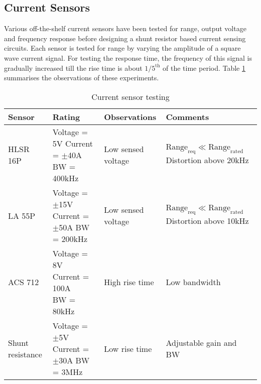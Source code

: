 \subsection{Current Sensors}
    Various off-the-shelf current sensors have been tested for range, output voltage and frequency response before designing a shunt resistor based current sensing  circuits. Each sensor is tested for range by varying the amplitude of a square wave current signal. For testing the response time, the frequency of this signal is gradually increased till the rise time is about $1/5^\text{th}$ of the time period. Table \ref{tab:current-sensor} summarises the observations of these experiments.
	\begin{table}[h]
	\centering
		\begin{tabular}{| l | p{3cm} | p{4cm} | p{4cm} |} \hline
			\textbf{Sensor} & \textbf{Rating} & \textbf{Observations} & \textbf{Comments}\\ \hline
			HLSR 16P & \parbox[t]{3cm}{Voltage = 5V \\ Current = $\pm$40A \\ BW = 400kHz \vspace{1.5mm}} & Low sensed voltage & \parbox[t]{4cm}{$\text{Range}_\text{req}\ll\text{Range}_\text{rated}$ \\ Distortion above 20kHz} \\ \hline
			LA 55P & \parbox[t]{3cm}{Voltage = $\pm$15V \\ Current = $\pm$50A\\BW = 200kHz \vspace{1.5mm}} & Low sensed voltage & \parbox[t]{4cm}{$\text{Range}_\text{req} \ll \text{Range}_\text{rated}$ \\ Distortion above 10kHz} \\ \hline
			ACS 712 & \parbox[t]{3cm}{Voltage = 8V \\ Current = 100A\\BW = 80kHz \vspace{1.5mm}} & High rise time & Low bandwidth \\ \hline
			Shunt resistance & \parbox[t]{3cm}{Voltage = $\pm$5V \\ Current = $\pm$30A\\BW = 3MHz \vspace{1.5mm}} & Low rise time & \parbox[t]{4cm}{Adjustable gain and BW} \\ \hline
		\end{tabular}
		\caption{Current sensor testing}
		\label{tab:current-sensor}
	\end{table}
